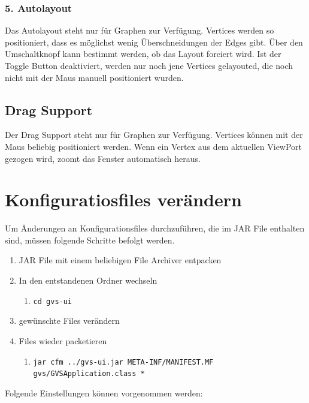 \documentclass[11pt,a4paper,english,oneside]{book}
\numberwithin{equation}{chapter}
\begin{document}
	\subsubsection{5. Autolayout}
	Das Autolayout steht nur für Graphen zur Verfügung. Vertices werden so positioniert, dass es möglichst wenig Überschneidungen der Edges gibt. Über den Umschaltknopf kann bestimmt werden, ob das Layout forciert wird. Ist der Toggle Button deaktiviert, werden nur noch jene Vertices gelayouted, die noch nicht mit der Maus manuell positioniert wurden.
	
	\subsection{Drag Support}
	Der Drag Support steht nur für Graphen zur Verfügung. Vertices können mit der Maus beliebig positioniert werden. Wenn ein Vertex aus dem aktuellen ViewPort gezogen wird, zoomt das Fenster automatisch heraus.
		
	\clearpage
	
	\section{Konfiguratiosfiles verändern}
	Um Änderungen an Konfigurationsfiles durchzuführen, die im JAR File enthalten sind, müssen folgende Schritte befolgt werden.
	
	\begin{enumerate}
		\item JAR File mit einem beliebigen File Archiver entpacken
		\item In den entstandenen Ordner wechseln
		\begin{enumerate}
			\item \lstinline{cd gvs-ui}
		\end{enumerate}
		\item gewünschte Files verändern
		\item Files wieder packetieren
		\begin{enumerate}
			\item \lstinline{jar cfm ../gvs-ui.jar META-INF/MANIFEST.MF gvs/GVSApplication.class *}
		\end{enumerate}
	\end{enumerate}

	Folgende Einstellungen können vorgenommen werden:
	
\end{document}
